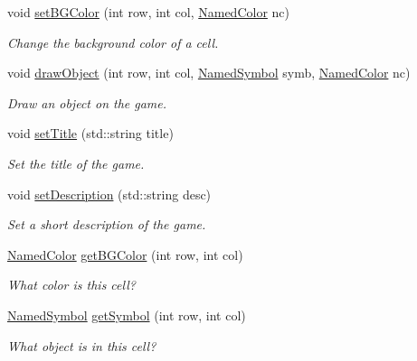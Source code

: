 \begin{DoxyCompactItemize}
void \hyperlink{classbridges_1_1game_1_1_game_base_ab667bbca1c81e5fb3aa8d81d70fe8cd2}{set\+B\+G\+Color} (int row, int col, \hyperlink{namespacebridges_1_1game_afaa832a4322b25b6a4ebfba832f10f26}{Named\+Color} nc)
\begin{DoxyCompactList}\small\item\em Change the background color of a cell. \end{DoxyCompactList}\item 
void \hyperlink{classbridges_1_1game_1_1_game_base_a3c76a4aac9c00a7ad54176f9e4d628ff}{draw\+Object} (int row, int col, \hyperlink{namespacebridges_1_1game_ab9a19c7ab6e2ebac2f95180e21733487}{Named\+Symbol} symb, \hyperlink{namespacebridges_1_1game_afaa832a4322b25b6a4ebfba832f10f26}{Named\+Color} nc)
\begin{DoxyCompactList}\small\item\em Draw an object on the game. \end{DoxyCompactList}\item 
void \hyperlink{classbridges_1_1game_1_1_game_base_a108c2e3050a4d3f3af9950434e97102a}{set\+Title} (std\+::string title)
\begin{DoxyCompactList}\small\item\em Set the title of the game. \end{DoxyCompactList}\item 
void \hyperlink{classbridges_1_1game_1_1_game_base_ab490d78e11e4117c3a4915c78afa0973}{set\+Description} (std\+::string desc)
\begin{DoxyCompactList}\small\item\em Set a short description of the game. \end{DoxyCompactList}\item 
\hyperlink{namespacebridges_1_1game_afaa832a4322b25b6a4ebfba832f10f26}{Named\+Color} \hyperlink{classbridges_1_1game_1_1_game_base_a924f911774a89d18ccb391bb28fd703c}{get\+B\+G\+Color} (int row, int col)
\begin{DoxyCompactList}\small\item\em What color is this cell? \end{DoxyCompactList}\item 
\hyperlink{namespacebridges_1_1game_ab9a19c7ab6e2ebac2f95180e21733487}{Named\+Symbol} \hyperlink{classbridges_1_1game_1_1_game_base_a0dfec715b0ed49c37b4b6689f2470b25}{get\+Symbol} (int row, int col)
\begin{DoxyCompactList}\small\item\em What object is in this cell? \end{DoxyCompactList}\item 

\end{DoxyCompactItemize}
